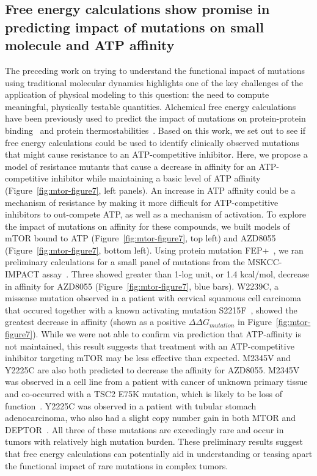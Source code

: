 \documentclass[phd,tocprelim]{cornell}
\begin{document}
\subsection{Free energy calculations show promise in predicting impact of mutations on small molecule and ATP affinity}
The preceding work on trying to understand the functional impact of mutations using traditional molecular dynamics highlights one of the key challenges of the application of physical modeling to this question: the need to compute meaningful, physically testable quantities. Alchemical free energy calculations have been previously used to predict the impact of mutations on protein-protein binding~\citep{clark2017free} and protein thermostabilities~\citep{steinbrecher2017predicting}. Based on this work, we set out to see if free energy calculations could be used to identify clinically observed mutations that might cause resistance to an ATP-competitive inhibitor. Here, we propose a model of resistance mutants that cause a decrease in affinity for an ATP-competitive inhibitor while maintaining a basic level of ATP affinity (Figure~\ref{fig:mtor-figure7}, left panels). An increase in ATP affinity could be a mechanism of resistance by making it more difficult for ATP-competitive inhibitors to out-compete ATP, as well as a mechanism of activation. To explore the impact of mutations on affinity for these compounds, we built models of mTOR bound to ATP (Figure~\ref{fig:mtor-figure7}, top left) and AZD8055 (Figure~\ref{fig:mtor-figure7}, bottom left). Using protein mutation FEP+~\citep{Hauser:2018vz,steinbrecher2017predicting}, we ran preliminary calculations for a small panel of mutations from the MSKCC-IMPACT assay~\citep{Zehir:Nat.Med.:2017}. Three showed greater than 1-log unit, or 1.4 kcal/mol, decrease in affinity for AZD8055 (Figure~\ref{fig:mtor-figure7}, blue bars). W2239C, a missense mutation observed in a patient with cervical squamous cell carcinoma that occured together with a known activating mutation S2215F~\citep{Cerami:2012eu,Gao:2013kd},  showed the greatest decrease in affinity (shown as a positive $\Delta \Delta G_{mutation}$ in Figure~\ref{fig:mtor-figure7}). While we were not able to confirm via prediction that ATP-affinity is not maintained, this result suggests that treatment with an ATP-competitive inhibitor targeting mTOR may be less effective than expected. M2345V and Y2225C are also both predicted to decrease the affinity for AZD8055. M2345V was observed in a cell line from a patient with cancer of unknown primary tissue and co-occurred with a TSC2 E75K mutation, which is likely to be loss of function~\citep{Barretina:2012fp}. Y2225C was observed in a patient with tubular stomach adenocarcinoma, who also had a slight copy number gain in both MTOR and DEPTOR~\citep{CancerGenomeAtlasResearchNetwork:2017fh}. All three of these mutations are exceedingly rare and occur in tumors with relatively high mutation burden. These preliminary results suggest that free energy calculations can potentially aid in understanding or teasing apart the functional impact of rare mutations in complex tumors.
\end{document}
